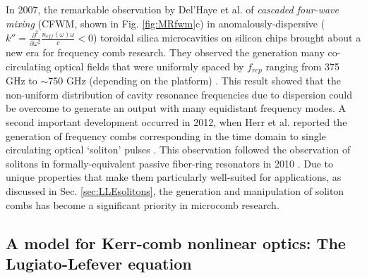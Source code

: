 
In 2007, the remarkable observation by Del'Haye et al. of \textit{cascaded four-wave mixing} (CFWM, shown in Fig. \ref{fig:MRfwm}c) in anomalously-dispersive ($k''=\frac{\partial^2}{\partial\omega^2}\frac{n_{eff}(\omega)\omega}{c}<0$) toroidal silica microcavities on silicon chips brought about a new era for frequency comb research. They observed the generation many co-circulating optical fields that were uniformly spaced by $f_{rep}$ ranging from 375 GHz to $\sim$750 GHz (depending on the platform) \cite{DelHaye2007}. This result showed that the non-uniform distribution of cavity resonance frequencies due to dispersion could be overcome to generate an output with many equidistant frequency modes. A second important development occurred in 2012, when Herr et al. reported the generation of frequency combs corresponding in the time domain to single circulating optical `soliton' pulses \cite{Herr2012a,Herr2014}. This observation followed the observation of solitons in formally-equivalent passive fiber-ring resonators in 2010 \cite{Leo2010a}. Due to unique properties that make them particularly well-suited for applications, as discussed in Sec. \ref{sec:LLEsolitons}, the generation and manipulation of soliton combs has become a significant priority in microcomb research. 

\subsection{A model for Kerr-comb nonlinear optics: The Lugiato-Lefever equation}\label{sec:LLE}

